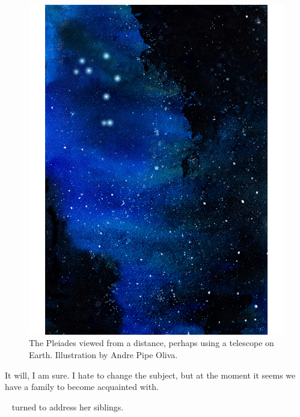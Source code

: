 \documentclass[main.tex]{subfiles}
\begin{document}
\begin{figure}
\includegraphics[width=\columnwidth,angle=270,origin=c]{ch1_4.pdf}
\caption{The Pleiades viewed from a distance, perhaps using a telescope on Earth.  Illustration by Andre Pipe Oliva.
\label{fig:fig4}}
\end{figure}


\par \Maia It will, I am sure.  I hate to change the subject, but at the moment it seems we have a family to become acquainted with.

\par \nar \rmmaia~ turned to address her siblings.

\end{document}
